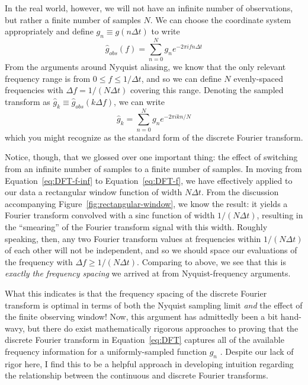 \documentclass[preprint]{aastex}
\newcommand{\fig}[1]{Figure~\ref{fig:#1}}
\newcommand{\Eq}[1]{Equation~\ref{eq:#1}}
\newcommand{\eq}[1]{\Eq{#1}}
\newcommand{\eqlabel}[1]{\label{eq:#1}}
\begin{document}
In the real world, however, we will not have an infinite number of observations,
but rather a finite number of samples $N$.
We can choose the coordinate system appropriately and define
$g_n \equiv g(n\Delta t)$ to write
\begin{equation}
  \hat{g}_{obs}(f) = \sum_{n=0}^N g_n e^{-2\pi i f n \Delta t}
  \eqlabel{DFT-f}
\end{equation}
From the arguments around Nyquist aliasing, we know that the only relevant
frequency range is from $0 \le f \le 1/\Delta t$, and so we can define $N$
evenly-spaced frequencies with $\Delta f = 1 / (N\Delta t)$ covering this range.
Denoting the sampled transform as
$\hat{g}_k \equiv \hat{g}_{obs}(k\Delta f)$, we can write
\begin{equation}
  \hat{g}_k = \sum_{n=0}^N g_n e^{-2\pi i k n / N}
  \eqlabel{DFT}
\end{equation}
which you might recognize as the standard form of the discrete Fourier
transform.

Notice, though, that we glossed over one important thing: the effect of switching
from an infinite number of samples to a finite number of samples.
In moving from \eq{DFT-f-inf} to \eq{DFT-f}, we have effectively applied
to our data a rectangular window function of width $N\Delta t$.
From the discussion accompanying \fig{rectangular-window}, we know the result: it yields a Fourier transform convolved with a sinc function of width
$1 / (N\Delta t)$, resulting in the ``smearing'' of the Fourier transform signal
with this width.
Roughly speaking, then, any two Fourier transform values at frequencies within
$1/(N\Delta t)$ of each other will not be independent, and so we should space
our evaluations of the frequency with $\Delta f \ge 1/(N\Delta t)$.
Comparing to above, we see that this is {\it exactly the frequency spacing}
we arrived at from Nyquist-frequency arguments.

What this indicates is that the frequency spacing of the discrete Fourier
transform is optimal in terms of both the Nyquist sampling limit
{\it and} the effect of the finite observing window!
Now, this argument has admittedly been a bit hand-wavy, but there do exist
mathematically rigorous approaches to proving that the discrete Fourier
transform in \eq{DFT} captures all of the available frequency information
for a uniformly-sampled function $g_n$
\citep[see, e.g.][]{FoundationsOfSignalProcessing}.
Despite our lack of rigor here, I find this to be a helpful approach
in developing intuition regarding the relationship between the
continuous and discrete Fourier transforms.
\end{document}
